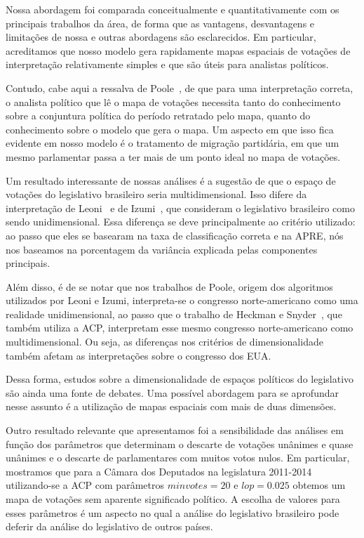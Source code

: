 \documentclass[
	article,			%
	12pt,				%
	oneside,			%
	a4paper,			%
	english,			%
	brazil,				%
	sumario=tradicional,
	oldfontcommands %
	]{abntex2}
\begin{document}
Nossa abordagem foi comparada conceitualmente e quantitativamente com os principais trabalhos da área, de forma que as vantagens, desvantagens e limitações de nossa e outras abordagens são esclarecidos. Em particular, acreditamos que nosso modelo gera rapidamente mapas espaciais de votações de interpretação relativamente simples e que são úteis para analistas políticos.

Contudo, cabe aqui a ressalva de Poole~\cite{poole2005book}, de que para uma interpretação correta, o analista político que lê o mapa de votações necessita tanto do conhecimento sobre a conjuntura política do período retratado pelo mapa, quanto do conhecimento sobre o modelo que gera o mapa. Um aspecto em que isso fica evidente em nosso modelo é o tratamento de migração partidária, em que um mesmo parlamentar passa a ter mais de um ponto ideal no mapa de votações.

Um resultado interessante de nossas análises é a sugestão de que o espaço de votações do legislativo brasileiro seria multidimensional. Isso difere da interpretação de Leoni~\cite{leoni02cdep} e de Izumi~\cite{izumi2016senado}, que consideram o legislativo brasileiro como sendo unidimensional. Essa diferença se deve principalmente ao critério utilizado: ao passo que eles se basearam na taxa de classificação correta e na APRE, nós nos baseamos na porcentagem da variância explicada pelas componentes principais. 

Além disso, é de se notar que nos trabalhos de Poole, origem dos algoritmos utilizados por Leoni e Izumi, interpreta-se o congresso norte-americano como uma realidade unidimensional, ao passo que o trabalho de Heckman e Snyder~\cite{heckman-snyder1997}, que também utiliza a ACP, interpretam esse mesmo congresso norte-americano como multidimensional. Ou seja, as diferenças nos critérios de dimensionalidade também afetam as interpretações sobre o congresso dos EUA.

Dessa forma, estudos sobre a dimensionalidade de espaços políticos do legislativo são ainda uma fonte de debates. Uma possível abordagem para se aprofundar nesse assunto é a utilização de mapas espaciais com mais de duas dimensões.

Outro resultado relevante que apresentamos foi a sensibilidade das análises em função dos parâmetros que determinam o descarte de votações unânimes e quase unânimes e o descarte de parlamentares com muitos votos nulos. Em particular, mostramos que para a Câmara dos Deputados na legislatura 2011-2014 utilizando-se a ACP com parâmetros $minvotes=20$ e $lop=0.025$ obtemos um mapa de votações sem aparente significado político. A escolha de valores para esses parâmetros é um aspecto no qual a análise do legislativo brasileiro pode deferir da análise do legislativo de outros países.
\end{document}
